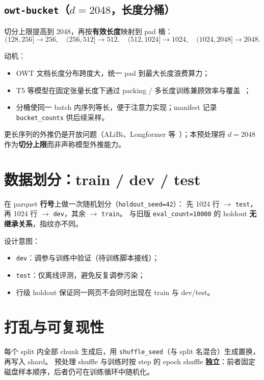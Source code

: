 \documentclass[UTF8,a4paper,11pt]{ctexart}
\begin{document}
\subsection{\texttt{owt-bucket}（$d=2048$，长度分桶）}

切分上限提高到 2048，再按\textbf{有效长度}映射到 pad 桶：
\[
(128,256] \to 256,\quad (256,512] \to 512,\quad (512,1024] \to 1024,\quad (1024,2048] \to 2048.
\]

动机：
\begin{itemize}
  \item OWT 文档长度分布跨度大，统一 pad 到最大长度浪费算力；
  \item T5 等模型在固定张量长度下通过 packing / 多长度训练兼顾效率与覆盖~\cite{raffel2020t5}；
  \item 分桶使同一 batch 内序列等长，便于注意力实现；manifest 记录 \texttt{bucket\_counts} 供后续采样。
\end{itemize}

更长序列的外推仍是开放问题（ALiBi、Longformer 等~\cite{press2022trainshort,beltagy2020longformer}）；本预处理将 $d=2048$ 作为\textbf{切分上限}而非声称模型外推能力。

\section{数据划分：train / dev / test}

在 parquet \textbf{行号}上做一次随机划分（\texttt{holdout\_seed=42}）：
先 1024 行 $\to$ \texttt{test}，再 1024 行 $\to$ \texttt{dev}，其余 $\to$ \texttt{train}。
与旧版 \texttt{eval\_count=10000} 的 holdout \textbf{无继承关系}，指纹亦不同。

设计意图：
\begin{itemize}
  \item \texttt{dev}：调参与训练中验证（待训练脚本接线）；
  \item \texttt{test}：仅离线评测，避免反复调参污染；
  \item 行级 holdout 保证同一网页不会同时出现在 train 与 dev/test。
\end{itemize}

\section{打乱与可复现性}

每个 split 内全部 chunk 生成后，用 \texttt{shuffle\_seed}（与 split 名混合）生成置换，再写入 shard。
预处理 shuffle 与训练时按 step 的 epoch shuffle \textbf{独立}：前者固定磁盘样本顺序，后者仍可在训练循环中随机化。
\end{document}
